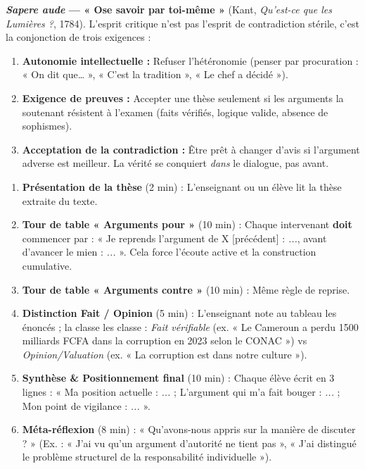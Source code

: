 \documentclass[11pt]{article}
\begin{document}
\begin{definition}
\textbf{\emph{Sapere aude} — « Ose savoir par toi-même »} (Kant, \emph{Qu'est-ce que les Lumières ?}, 1784). L'esprit critique n'est pas l'esprit de contradiction stérile, c'est la conjonction de trois exigences :
\begin{enumerate}
    \item \textbf{Autonomie intellectuelle :} Refuser l'hétéronomie (penser par procuration : « On dit que… », « C'est la tradition », « Le chef a décidé »).
    \item \textbf{Exigence de preuves :} Accepter une thèse seulement si les arguments la soutenant résistent à l'examen (faits vérifiés, logique valide, absence de sophismes).
    \item \textbf{Acceptation de la contradiction :} Être prêt à changer d'avis si l'argument adverse est meilleur. La vérité se conquiert \emph{dans} le dialogue, pas avant.
\end{enumerate}
\end{definition}

\begin{methode}
\begin{enumerate}
    \item \textbf{Présentation de la thèse} (2 min) : L'enseignant ou un élève lit la thèse extraite du texte.
    \item \textbf{Tour de table « Arguments pour »} (10 min) : Chaque intervenant \textbf{doit} commencer par : « Je reprends l'argument de X [précédent] : \emph{...}, avant d'avancer le mien : \emph{...} ». Cela force l'écoute active et la construction cumulative.
    \item \textbf{Tour de table « Arguments contre »} (10 min) : Même règle de reprise.
    \item \textbf{Distinction Fait / Opinion} (5 min) : L'enseignant note au tableau les énoncés ; la classe les classe : \emph{Fait vérifiable} (ex. « Le Cameroun a perdu 1500 milliards FCFA dans la corruption en 2023 selon le CONAC ») vs \emph{Opinion/Valuation} (ex. « La corruption est dans notre culture »).
    \item \textbf{Synthèse \& Positionnement final} (10 min) : Chaque élève écrit en 3 lignes : « Ma position actuelle : \emph{...} ; L'argument qui m'a fait bouger : \emph{...} ; Mon point de vigilance : \emph{...} ».
    \item \textbf{Méta-réflexion} (8 min) : « Qu'avons-nous appris sur la manière de discuter ? » (Ex. : « J'ai vu qu'un argument d'autorité ne tient pas », « J'ai distingué le problème structurel de la responsabilité individuelle »).
\end{enumerate}
\end{methode}
\end{document}
